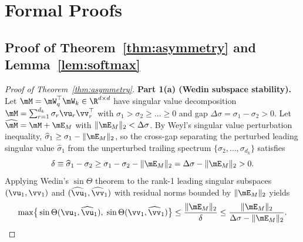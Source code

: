 \documentclass[10pt]{article} %
\begin{document}



\appendix

\section{Formal Proofs}
\label{app:proofs}

\subsection{Proof of Theorem~\ref{thm:asymmetry} and Lemma~\ref{lem:softmax}}

\begin{proof}[Proof of Theorem~\ref{thm:asymmetry}]
\textbf{Part 1(a) (Wedin subspace stability).}
Let $\mM = \mW_q^\top \mW_k \in \R^{d \times d}$ have singular value decomposition $\mM = \sum_{r=1}^{d_k} \sigma_r \vu_r \vv_r^\top$ with $\sigma_1 > \sigma_2 \ge \dots \ge 0$ and gap $\Delta\sigma = \sigma_1 - \sigma_2 > 0$. Let $\widehat{\mM} = \mM + \mE_M$ with $\|\mE_M\|_2 < \Delta\sigma$. By Weyl's singular value perturbation inequality, $\widehat{\sigma}_1 \ge \sigma_1 - \|\mE_M\|_2$, so the cross-gap separating the perturbed leading singular value $\widehat{\sigma}_1$ from the unperturbed trailing spectrum $\{\sigma_2,\dots,\sigma_{d_k}\}$ satisfies
\begin{equation}
    \delta \equiv \widehat{\sigma}_1 - \sigma_2 \ge \sigma_1 - \sigma_2 - \|\mE_M\|_2 = \Delta\sigma - \|\mE_M\|_2 > 0.
\end{equation}
Applying Wedin's $\sin\Theta$ theorem \citep{wedin1972perturbation} to the rank-1 leading singular subspaces $(\vu_1, \vv_1)$ and $(\widehat{\vu}_1, \widehat{\vv}_1)$ with residual norms bounded by $\|\mE_M\|_2$ yields
\begin{equation}
    \max\!\big\{\sin\Theta(\vu_1, \widehat{\vu}_1),\; \sin\Theta(\vv_1, \widehat{\vv}_1)\big\}
    \le \frac{\|\mE_M\|_2}{\delta}
    \le \frac{\|\mE_M\|_2}{\Delta\sigma - \|\mE_M\|_2}.
\end{equation}


\end{proof}
\end{document}
